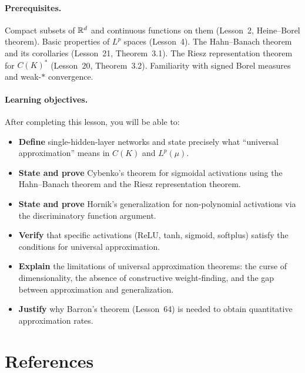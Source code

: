 \documentclass[11pt,a4paper]{article}
\begin{document}
\paragraph{Prerequisites.}
Compact subsets of $\mathbb{R}^d$ and continuous functions on them
(Lesson~2, Heine--Borel theorem).  Basic properties of $L^p$ spaces
(Lesson~4).  The Hahn--Banach theorem and its corollaries
(Lesson~21, Theorem~3.1).  The Riesz representation theorem for
$C(K)^*$ (Lesson~20, Theorem~3.2).  Familiarity with signed Borel
measures and weak-$*$ convergence.

\paragraph{Learning objectives.}
After completing this lesson, you will be able to:
\begin{itemize}[nosep]
  \item \textbf{Define} single-hidden-layer networks and state precisely
    what ``universal approximation'' means in $C(K)$ and $L^p(\mu)$.
  \item \textbf{State and prove} Cybenko's theorem for sigmoidal
    activations using the Hahn--Banach theorem and the Riesz representation
    theorem.
  \item \textbf{State and prove} Hornik's generalization for non-polynomial
    activations via the discriminatory function argument.
  \item \textbf{Verify} that specific activations (ReLU, tanh, sigmoid,
    softplus) satisfy the conditions for universal approximation.
  \item \textbf{Explain} the limitations of universal approximation
    theorems: the curse of dimensionality, the absence of constructive
    weight-finding, and the gap between approximation and generalization.
  \item \textbf{Justify} why Barron's theorem (Lesson~64) is needed to
    obtain quantitative approximation rates.
\end{itemize}

\section{References}
\label{sec:references}
\end{document}
